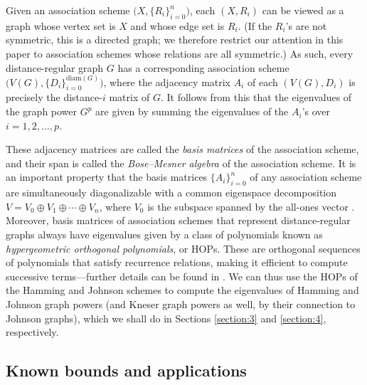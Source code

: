 \documentclass{article}
\numberwithin{equation}{section}
\theoremstyle{plain}
\begin{document}
Given an association scheme $\bigl(X, \{R_i\}_{i = 0}^n\bigr)$, each $(X, R_i)$ can be viewed as a graph whose vertex set is $X$ and whose edge set is $R_i$. (If the $R_i$'s are not symmetric, this is a directed graph; we therefore restrict our attention in this paper to association schemes whose relations are all symmetric.) As such, every distance-regular graph $G$ has a corresponding association scheme $\bigl(V(G), \{D_i\}_{i = 0}^{\mathrm{diam}(G)}\bigr)$, where the adjacency matrix $A_i$ of each $(V(G), D_i)$ is precisely the distance-$i$ matrix of $G$. It follows from this that the eigenvalues of the graph power $G^p$ are given by summing the eigenvalues of the $A_i$'s over $i = 1, 2, \ldots, p$.

These adjacency matrices are called the \emph{basis matrices} of the association scheme, and their span is called the \emph{Bose--Mesner algebra} of the association scheme. It is an important property that the basis matrices $\{A_i\}_{i = 0}^n$ of any association scheme are simultaneously diagonalizable with a common eigenspace decomposition $V = V_0 \oplus V_1 \oplus \cdots \oplus V_n$, where $V_0$ is the subspace spanned by the all-ones vector \cite[pp. 58--60]{BI84}. Moreover, basis matrices of association schemes that represent distance-regular graphs always have eigenvalues given by a class of polynomials known as \emph{hypergeometric orthogonal polynomials}, or HOPs. These are orthogonal sequences of polynomials that satisfy recurrence relations, making it efficient to compute successive terms---further details can be found in \cite{KS98}. We can thus use the HOPs of the Hamming and Johnson schemes to compute the eigenvalues of Hamming and Johnson graph powers (and Kneser graph powers as well, by their connection to Johnson graphs), which we shall do in Sections \ref{section:3} and \ref{section:4}, respectively.

\subsection{Known bounds and applications}\label{subsection:2.4}
\end{document}
